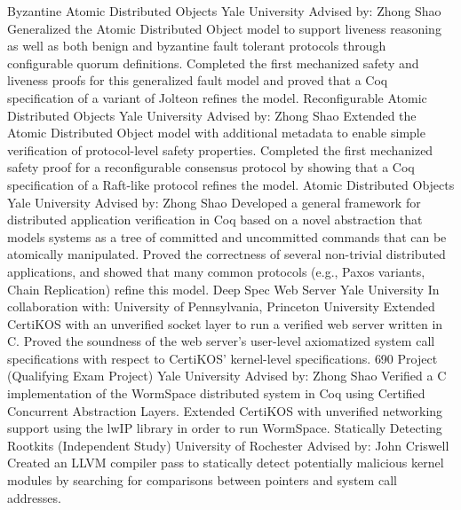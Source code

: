 \documentclass[10pt,letterpaper,sans]{moderncv}
\begin{document}
        {Byzantine Atomic Distributed Objects}
        {Yale University}
        {Advised by: Zhong Shao}
        {}
        {%
          Generalized the Atomic Distributed Object model to support liveness
          reasoning as well as both benign and byzantine fault tolerant
          protocols through configurable quorum definitions.
          Completed the first mechanized safety and liveness proofs for this
          generalized fault model and proved that a Coq specification of a
          variant of Jolteon refines the model.
        }
        {Reconfigurable Atomic Distributed Objects}
        {Yale University}
        {Advised by: Zhong Shao}
        {}
        {%
          Extended the Atomic Distributed Object model with additional metadata
          to enable simple verification of protocol-level safety properties.
          Completed the first mechanized safety proof for a reconfigurable
          consensus protocol by showing that a Coq specification of a Raft-like
          protocol refines the model.
        }
        {Atomic Distributed Objects}
        {Yale University}
        {Advised by: Zhong Shao}
        {}
        {%
          Developed a general framework for distributed application verification
          in Coq based on a novel abstraction that models systems as a tree of
          committed and uncommitted commands that can be atomically manipulated.
          Proved the correctness of several non-trivial distributed
          applications, and showed that many common protocols (e.g., Paxos
          variants, Chain Replication) refine this model.
        }
        {Deep Spec Web Server}
        {Yale University}
        {In collaboration with: University of Pennsylvania, Princeton University}
        {}
        {%
          Extended CertiKOS with an unverified socket layer to run a verified
          web server written in C.
          Proved the soundness of the web server's user-level axiomatized system
          call specifications with respect to CertiKOS' kernel-level specifications.
        }
        {690 Project (Qualifying Exam Project)}
        {Yale University}
        {Advised by: Zhong Shao}
        {}
        {%
          Verified a C implementation of the WormSpace distributed system in Coq
          using Certified Concurrent Abstraction Layers.
          Extended CertiKOS with unverified networking support using the lwIP
          library in order to run WormSpace.
        }
        {Statically Detecting Rootkits (Independent Study)}
        {University of Rochester}
        {Advised by: John Criswell}
        {}
        {%
          Created an LLVM compiler pass to statically detect potentially
          malicious kernel modules by searching for comparisons between pointers
          and system call addresses.
        }
\end{document}
